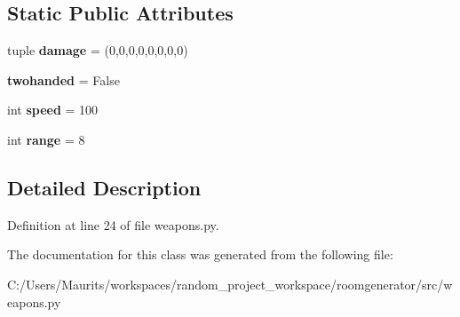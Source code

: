 \subsection*{Static Public Attributes}
\begin{DoxyCompactItemize}
\item 
\hypertarget{classweapons_1_1_weapon_a9cfaa94a759db04c3e138fcfb879e8ce}{}tuple {\bfseries damage} = (0,0,0,0,0,0,0,0)\label{classweapons_1_1_weapon_a9cfaa94a759db04c3e138fcfb879e8ce}

\item 
\hypertarget{classweapons_1_1_weapon_a7947b6258431e6e1af7d4b93b1084579}{}{\bfseries twohanded} = False\label{classweapons_1_1_weapon_a7947b6258431e6e1af7d4b93b1084579}

\item 
\hypertarget{classweapons_1_1_weapon_a0ccfce16535e47c8a9948f7931352ba8}{}int {\bfseries speed} = 100\label{classweapons_1_1_weapon_a0ccfce16535e47c8a9948f7931352ba8}

\item 
\hypertarget{classweapons_1_1_weapon_a7361b9937f6ac8fdb66ea2607604ddd0}{}int {\bfseries range} = 8\label{classweapons_1_1_weapon_a7361b9937f6ac8fdb66ea2607604ddd0}

\end{DoxyCompactItemize}


\subsection{Detailed Description}


Definition at line 24 of file weapons.\+py.



The documentation for this class was generated from the following file\+:\begin{DoxyCompactItemize}
\item 
C\+:/\+Users/\+Maurits/workspaces/random\+\_\+project\+\_\+workspace/roomgenerator/src/weapons.\+py\end{DoxyCompactItemize}
